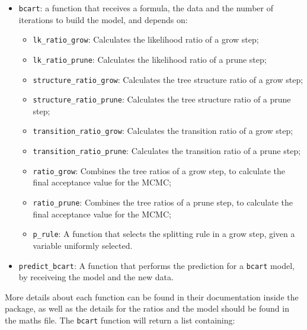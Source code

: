 \documentclass[]{article}
\providecommand{\tightlist}{%
  \setlength{\itemsep}{0pt}\setlength{\parskip}{0pt}}
\begin{document}
\begin{itemize}
\tightlist
\item
  \texttt{bcart}: a function that receives a formula, the data and the
  number of iterations to build the model, and depends on:

  \begin{itemize}
  \tightlist
  \item
    \texttt{lk\_ratio\_grow}: Calculates the likelihood ratio of a grow
    step;
  \item
    \texttt{lk\_ratio\_prune}: Calculates the likelihood ratio of a
    prune step;
  \item
    \texttt{structure\_ratio\_grow}: Calculates the tree structure ratio
    of a grow step;
  \item
    \texttt{structure\_ratio\_prune}: Calculates the tree structure
    ratio of a prune step;
  \item
    \texttt{transition\_ratio\_grow}: Calculates the transition ratio of
    a grow step;
  \item
    \texttt{transition\_ratio\_prune}: Calculates the transition ratio
    of a prune step;
  \item
    \texttt{ratio\_grow}: Combines the tree ratios of a grow step, to
    calculate the final acceptance value for the MCMC;
  \item
    \texttt{ratio\_prune}: Combines the tree ratios of a prune step, to
    calculate the final acceptance value for the MCMC;
  \item
    \texttt{p\_rule}: A function that selects the splitting rule in a
    grow step, given a variable uniformly selected.
  \end{itemize}
\item
  \texttt{predict\_bcart}: A function that performs the prediction for a
  \texttt{bcart} model, by receiveing the model and the new data.
\end{itemize}

More details about each function can be found in their documentation
inside the package, as well as the details for the ratios and the model
should be found in the maths file. The \texttt{bcart} function will
return a list containing:
\end{document}
